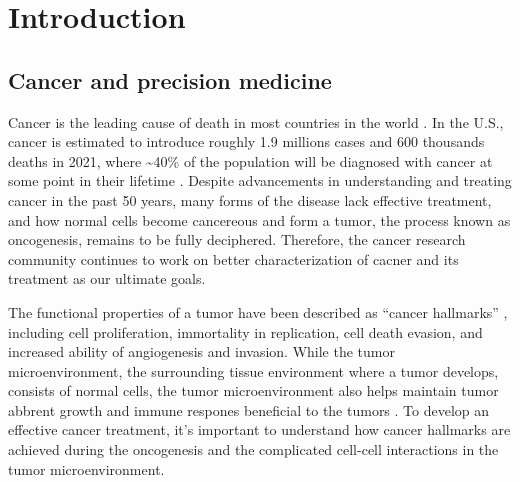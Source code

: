 \chapter{Introduction}
\label{chap:intro}











\section{Cancer and precision medicine}
Cancer is the leading cause of death in most countries in the world \cite{sungh_brayf:GlobalCancer2021}. In the U.S., cancer is estimated to introduce roughly 1.9 millions cases and 600 thousands deaths in 2021, where \textasciitilde40\% of the population will be diagnosed with cancer at some point in their lifetime \cite{siegelrl_jemala:CancerStatistics2021}. Despite advancements in understanding and treating cancer in the past 50 years, many forms of the disease lack effective treatment, and how normal cells become cancereous and form a tumor, the process known as oncogenesis, remains to be fully deciphered. Therefore, the cancer research community continues to work on better characterization of cacner and its treatment as our ultimate goals.

The functional properties of a tumor have been described as ``cancer hallmarks'' \cite{hanahand_weinbergra:HallmarksCancer2011}, including cell proliferation, immortality in replication, cell death evasion, and increased ability of angiogenesis and invasion. While the tumor microenvironment, the surrounding tissue environment where a tumor develops, consists of normal cells, the tumor microenvironment also helps maintain tumor abbrent growth and immune respones beneficial to the tumors \cite{hanahand_weinbergra:HallmarksCancer2011,quaildf_joyceja:MicroenvironmentalRegulation2013}. To develop an effective cancer treatment, it's important to understand how cancer hallmarks are achieved during the oncogenesis and the complicated cell-cell interactions in the tumor microenvironment.



